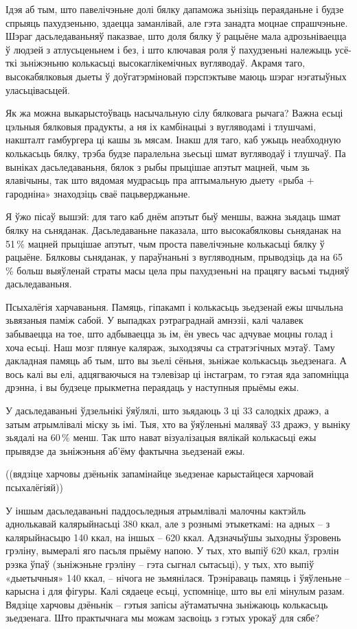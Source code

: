 Ідэя аб тым, што павелічэньне долі бялку дапаможа зьнізіць пераяданьне і будзе спрыяць пахудзеньню, здаецца заманлівай, але гэта занадта моцнае спрашчэньне. Шэраг дасьледаваньняў паказвае, што доля бялку ў рацыёне мала адрозьніваецца ў людзей з атлусьценьнем і без, і што ключавая роля ў пахудзеньні належыць усё-ткі зьніжэньню колькасьці высокаглікемічных вугляводаў. Акрамя таго, высокабялковыя дыеты ў доўгатэрміновай пэрспэктыве маюць шэраг нэгатыўных уласьцівасьцей.

Як жа можна выкарыстоўваць насычальную сілу бялковага рычага? Важна есьці цэльныя бялковыя прадукты, а ня іх камбінацыі з вугляводамі і тлушчамі, накшталт гамбургера ці кашы зь мясам. Інакш для таго, каб ужыць неабходную колькасьць бялку, трэба будзе паралельна зьесьці шмат вугляводаў і тлушчаў. Па выніках дасьледаваньня, бялок з рыбы прыцішае апэтыт мацней, чым зь ялавічыны, так што вядомая мудрасьць пра аптымальную дыету «рыба + гародніна» знаходзіць сваё пацьверджаньне.

Я ўжо пісаў вышэй: для таго каб днём апэтыт быў меншы, важна зьядаць шмат бялку на сьняданак. Дасьледаваньне паказала, што высокабялковы сьняданак на 51\,\% мацней прыцішае апэтыт, чым проста павелічэньне колькасьці бялку ў рацыёне. Бялковы сьняданак, у параўнаньні з вугляводным, прыводзіць да на 65\,\% больш выяўленай страты масы цела пры пахудзеньні на працягу васьмі тыдняў дасьледаваньня.

Псыхалёгія харчаваньня. Памяць, гіпакамп і колькасьць зьедзенай ежы шчыльна зьвязаныя паміж сабой. У выпадках рэтраграднай амнэзіі, калі чалавек забываецца на тое, што адбываецца зь ім, ён увесь час адчувае моцны голад і хоча есьці. Наш мозг плянуе каляраж, зыходзячы са стратэгічных мэтаў. Таму дакладная памяць аб тым, што вы зьелі сёньня, зьніжае колькасьць зьедзенага. А вось калі вы елі, адцягваючыся на тэлевізар ці інстаграм, то гэтая яда запомніцца дрэнна, і вы будзеце прыкметна пераядаць у наступныя прыёмы ежы.

У дасьледаваньні ўдзельнікі ўяўлялі, што зьядаюць 3 ці 33 салодкіх дражэ, а затым атрымлівалі міску зь імі. Тыя, хто ва ўяўленьні маляваў 33 дражэ, у выніку зьядалі на 60\,\% менш. Так што нават візуалізацыя вялікай колькасьці ежы прывядзе да зьніжэньня аб'ёму фактычна зьедзенай ежы.

((вядзіце харчовы дзёньнік запамінайце зьедзенае карыстайцеся харчовай псыхалёгіяй))

У іншым дасьледаваньні паддосьледныя атрымлівалі малочны кактэйль аднолькавай калярыйнасьці 380 ккал, але з рознымі этыкеткамі: на адных – з калярыйнасьцю 140 ккал, на іншых – 620 ккал. Адзначыўшы зыходны ўзровень грэліну, вымералі яго пасьля прыёму напою. У тых, хто выпіў 620 ккал, грэлін рэзка ўпаў (зьніжэньне грэліну – гэта сыгнал сытасьці), у тых, хто выпіў «дыетычныя» 140 ккал, – нічога не зьмянілася. Трэніраваць памяць і ўяўленьне – карысна і для фігуры. Калі сядаеце есьці, успомніце, што вы елі мінулым разам. Вядзіце харчовы дзёньнік – гэтыя запісы аўтаматычна зьніжаюць колькасьць зьедзенага. Што практычнага мы можам засвоіць з гэтых урокаў для сябе?

